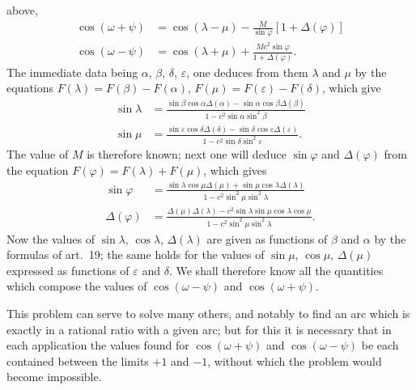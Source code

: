 \documentclass{article}
\begin{document}
above,
\[ \begin{aligned} \cos(\omega+\psi)&=\cos(\lambda-\mu)-\frac{M}{\sin\varphi}[1+\Delta(\varphi)]\\ \cos(\omega-\psi)&=\cos(\lambda+\mu)+\frac{Mc^{2}\sin\varphi}{1+\Delta(\varphi)}. \end{aligned} \]
The immediate data being $\alpha$, $\beta$, $\delta$, $\varepsilon$, one deduces from them $\lambda$ and $\mu$ by the equations $F(\lambda)=F(\beta)-F(\alpha)$, $F(\mu)=F(\varepsilon)-F(\delta)$, which give
\[ \begin{aligned} \sin\lambda&=\frac{\sin\beta\cos\alpha\Delta(\alpha)-\sin\alpha\cos\beta\Delta(\beta)}{1-c^{2}\sin\alpha\sin^{2}\beta}\\ \sin\mu&=\frac{\sin\varepsilon\cos\delta\Delta(\delta)-\sin\delta\cos\varepsilon\Delta(\varepsilon)}{1-c^{2}\sin\delta\sin^{2}\varepsilon}. \end{aligned} \]
The value of $M$ is therefore known; next one will deduce $\sin\varphi$ and $\Delta(\varphi)$ from the equation $F(\varphi)=F(\lambda)+F(\mu)$, which gives
\[ \begin{aligned} \sin\varphi&=\frac{\sin\lambda\cos\mu\Delta(\mu)+\sin\mu\cos\lambda\Delta(\lambda)}{1-c^{2}\sin^{2}\mu\sin^{2}\lambda}\\ \Delta(\varphi)&=\frac{\Delta(\mu)\Delta(\lambda)-c^{2}\sin\lambda\sin\mu\cos\lambda\cos\mu}{1-c^{2}\sin^{2}\mu\sin^{2}\lambda}. \end{aligned} \]
Now the values of $\sin\lambda$, $\cos\lambda$, $\Delta(\lambda)$ are given as functions of $\beta$ and $\alpha$ by the formulas of art.~19; the same holds for the values of $\sin\mu$, $\cos\mu$, $\Delta(\mu)$ expressed as functions of $\varepsilon$ and $\delta$. We shall therefore know all the quantities which compose the values of $\cos(\omega-\psi)$ and $\cos(\omega+\psi)$.

This problem can serve to solve many others, and notably to find an arc which is exactly in a rational ratio with a given arc; but for this it is necessary that in each application the values found for $\cos(\omega+\psi)$ and $\cos(\omega-\psi)$ be each contained between the limits $+1$ and $-1$, without which the problem would become impossible.
\end{document}

